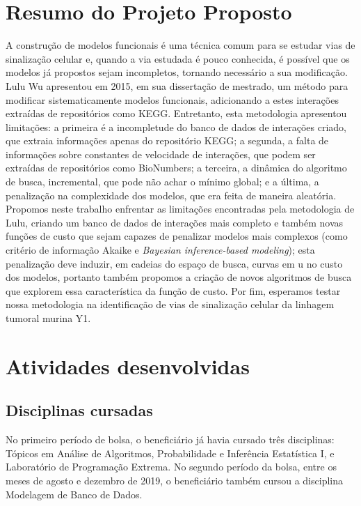 \documentclass[12pt]{article}
\begin{document}
\section{Resumo do Projeto Proposto} \label{sec:resumo} %
A construção de modelos funcionais é uma técnica comum para se 
estudar vias de sinalização celular e, quando a via estudada é pouco
conhecida, é possível que os modelos já propostos sejam incompletos, 
tornando necessário a sua modificação.
Lulu Wu apresentou em 2015, em sua dissertação de mestrado, um método 
para  modificar sistematicamente modelos funcionais, adicionando a estes
interações extraídas de repositórios como KEGG. Entretanto, esta 
metodologia apresentou limitações: a primeira é a incompletude do banco 
de dados de interações criado, que extraia informações apenas do 
repositório KEGG; a segunda, a falta de informações sobre constantes 
de velocidade de interações, que podem ser extraídas de repositórios 
como BioNumbers; a terceira, a dinâmica do algoritmo de busca, 
incremental, que pode não achar o mínimo global; e a última, a 
penalização na complexidade dos modelos, que era feita de maneira 
aleatória. Propomos neste trabalho enfrentar as limitações encontradas
pela metodologia de Lulu, criando um banco de dados de interações mais
completo e também novas funções de custo que sejam capazes de 
penalizar modelos mais complexos (como critério de informação Akaike e 
{\em Bayesian inference-based modeling}); esta penalização deve induzir,
em cadeias do  espaço de busca, curvas em u no custo dos modelos, 
portanto também propomos a criação de novos algoritmos de busca que 
explorem essa característica da função de custo. Por fim, esperamos 
testar nossa metodologia na identificação de vias de sinalização celular 
da linhagem tumoral murina Y1.



\section{Atividades desenvolvidas}

\subsection{Disciplinas cursadas}
No primeiro período de bolsa, o beneficiário já havia cursado três
disciplinas: Tópicos em Análise de Algoritmos, Probabilidade e
Inferência Estatística I, e Laboratório de Programação Extrema. No
segundo período da bolsa, entre os meses de agosto e dezembro de 2019, o
beneficiário também cursou a disciplina Modelagem de Banco de Dados.
\end{document}
